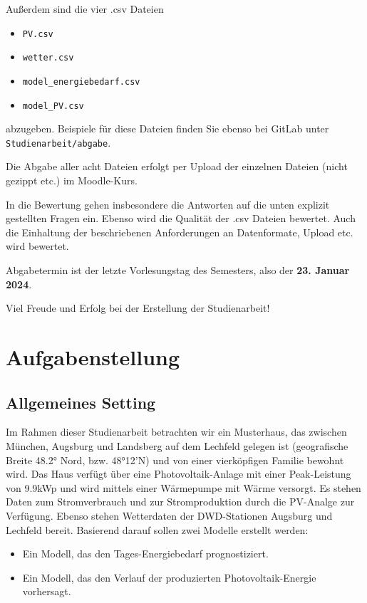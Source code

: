\documentclass[11pt,a4paper]{article}
\begin{document}
Außerdem sind die vier .csv Dateien
\begin{itemize}
    \item \texttt{PV.csv}
    \item \texttt{wetter.csv}
    \item \texttt{model\_energiebedarf.csv}
    \item \texttt{model\_PV.csv}
\end{itemize}
abzugeben. Beispiele für diese Dateien finden Sie ebenso bei GitLab unter \texttt{Studienarbeit/abgabe}.

Die Abgabe aller acht Dateien erfolgt per Upload der einzelnen Dateien (nicht gezippt etc.) im Moodle-Kurs.

In die Bewertung gehen insbesondere die Antworten auf die unten explizit gestellten Fragen ein. Ebenso wird die Qualität der .csv Dateien bewertet. Auch die Einhaltung der beschriebenen Anforderungen an Datenformate, Upload etc. wird bewertet.

Abgabetermin ist der letzte Vorlesungstag des Semesters, also der {\bf 23. Januar 2024}.

\vspace{3cm}
\begin{center}
	Viel Freude und Erfolg bei der Erstellung der Studienarbeit!
\end{center}

\newpage


\section*{Aufgabenstellung}
\subsection*{Allgemeines Setting}
Im Rahmen dieser Studienarbeit betrachten wir ein Musterhaus, das zwischen München, Augsburg und Landsberg auf dem Lechfeld gelegen ist (geografische Breite 48.2° Nord, bzw. 48°12'N) und von einer vierköpfigen Familie bewohnt wird. Das Haus verfügt über eine Photovoltaik-Anlage mit einer Peak-Leistung von 9.9kWp und wird mittels einer Wärmepumpe mit Wärme versorgt. Es stehen Daten zum Stromverbrauch und zur Stromproduktion durch die PV-Analge zur Verfügung. Ebenso stehen Wetterdaten der DWD-Stationen Augsburg und Lechfeld bereit. Basierend darauf sollen zwei Modelle erstellt werden:
\begin{itemize}
	\item Ein Modell, das den Tages-Energiebedarf prognostiziert.
	\item Ein Modell, das den Verlauf der produzierten Photovoltaik-Energie vorhersagt.
\end{itemize}
\end{document}
